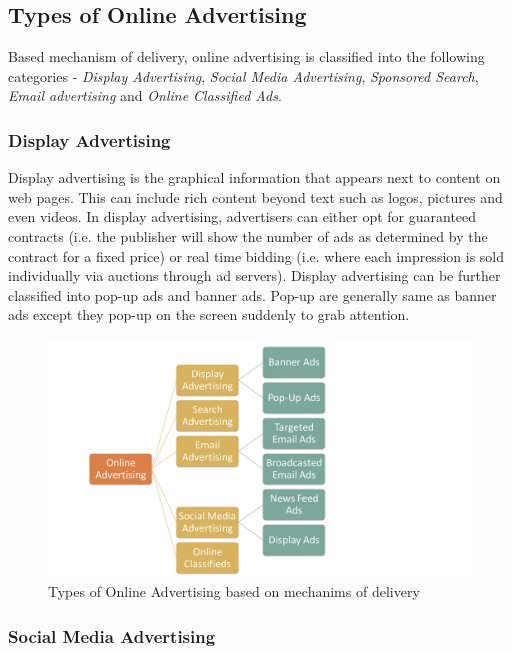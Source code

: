 \subsection{Types of Online Advertising}

Based mechanism of delivery, online advertising is classified into the following categories - \textit{Display Advertising}, \textit{Social Media Advertising}, \textit{Sponsored Search}, \textit{Email advertising} and \textit{Online Classified Ads}. 


\subsubsection{Display Advertising}
Display advertising is the graphical information that appears next to content on web pages. This can include rich content beyond text such as logos, pictures and even videos. In display advertising, advertisers can either opt for guaranteed contracts (i.e. the publisher will show the number of ads as determined by the contract for a fixed price) or real time bidding (i.e. where each impression is sold individually via auctions through ad servers). Display advertising can be further classified into pop-up ads and banner ads. Pop-up are generally same as banner ads except they pop-up on the screen suddenly to grab attention.


\begin{figure}
	\centering
\includegraphics[scale=0.5]{visuals/Presentation.pdf}
	\caption{Types of Online Advertising based on mechanims of delivery}
	\label{fig:types}
\end{figure}


\subsubsection{Social Media Advertising}

